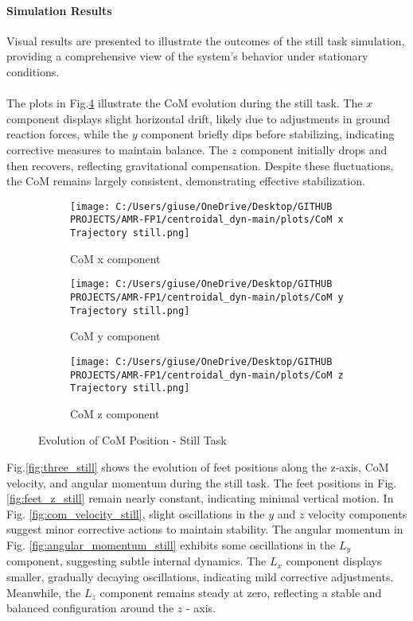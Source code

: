 \documentclass[main.tex]{subfiles}
\begin{document}
\begin{sloppypar}
\paragraph{Simulation Results}
Visual results are presented to illustrate the outcomes of the still task simulation, providing a comprehensive view of the system’s behavior under stationary conditions.\\
\\
The plots in Fig.\ref{fig:com_still} illustrate the CoM evolution during the still task. The \( x \) component displays slight horizontal drift, likely due to adjustments in ground reaction forces, while the \( y \) component briefly dips before stabilizing, indicating corrective measures to maintain balance. The \( z \) component initially drops and then recovers, reflecting gravitational compensation. Despite these fluctuations, the CoM remains largely consistent, demonstrating effective stabilization. \\
\begin{figure}[H]
    \centering
    \begin{subfigure}[b]{0.32\textwidth}
        \centering
        \texttt{[image: C:/Users/giuse/OneDrive/Desktop/GITHUB PROJECTS/AMR-FP1/centroidal\_dyn-main/plots/CoM x Trajectory still.png]}
        \caption{CoM x component}
        \label{fig:com_x_still}
    \end{subfigure}
    \hfill
    \begin{subfigure}[b]{0.32\textwidth}
        \centering
        \texttt{[image: C:/Users/giuse/OneDrive/Desktop/GITHUB PROJECTS/AMR-FP1/centroidal\_dyn-main/plots/CoM y Trajectory still.png]}
        \caption{CoM y component}
        \label{fig:com_y_still}
    \end{subfigure}
    \hfill
    \begin{subfigure}[b]{0.32\textwidth}
        \centering
        \texttt{[image: C:/Users/giuse/OneDrive/Desktop/GITHUB PROJECTS/AMR-FP1/centroidal\_dyn-main/plots/CoM z Trajectory still.png]}
        \caption{CoM z component}
        \label{fig:com_z_still}
    \end{subfigure}
    \caption{Evolution of CoM Position - Still Task}
    \label{fig:com_still}
\end{figure}
Fig.\ref{fig:three_still} shows the evolution of feet positions along the z-axis, CoM velocity, and angular momentum during the still task. The feet positions in Fig. \ref{fig:feet_z_still} remain nearly constant, indicating minimal vertical motion. In Fig. \ref{fig:com_velocity_still}, slight oscillations in the $y$ and $z$ velocity components suggest minor corrective actions to maintain stability. The angular momentum in Fig. \ref{fig:angular_momentum_still} exhibits some oscillations in the $L_y$ component, suggesting subtle internal dynamics. The $L_x$ component displays smaller, gradually decaying oscillations, indicating mild corrective adjustments. Meanwhile, the $L_z$ component remains steady at zero, reflecting a stable and balanced configuration around the $z$ - axis. 

\end{sloppypar}
\end{document}
